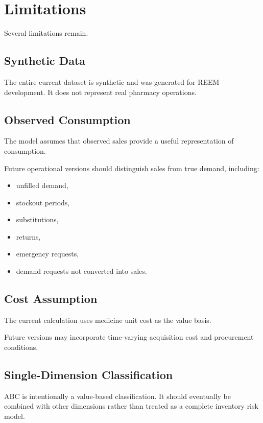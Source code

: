 \documentclass[12pt]{article}
\begin{document}
\section{Limitations}

Several limitations remain.

\subsection{Synthetic Data}

The entire current dataset is synthetic and was generated for REEM
development. It does not represent real pharmacy operations.

\subsection{Observed Consumption}

The model assumes that observed sales provide a useful representation of
consumption.

Future operational versions should distinguish sales from true demand,
including:

\begin{itemize}
    \item unfilled demand,
    \item stockout periods,
    \item substitutions,
    \item returns,
    \item emergency requests,
    \item demand requests not converted into sales.
\end{itemize}

\subsection{Cost Assumption}

The current calculation uses medicine unit cost as the value basis.

Future versions may incorporate time-varying acquisition cost and procurement
conditions.

\subsection{Single-Dimension Classification}

ABC is intentionally a value-based classification. It should eventually be
combined with other dimensions rather than treated as a complete inventory
risk model.
\end{document}
